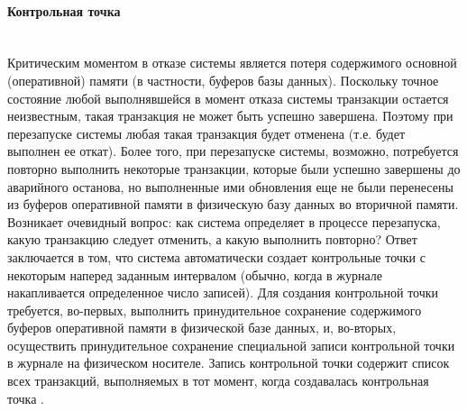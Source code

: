 \paragraph{Контрольная точка} ~\\
Критическим моментом в отказе системы является потеря содержимого основной
(оперативной) памяти (в частности, буферов базы данных). Поскольку точное состояние
любой выполнявшейся в момент отказа системы транзакции остается неизвестным, такая транзакция не может быть успешно завершена. Поэтому при перезапуске системы
любая такая транзакция будет отменена (т.е. будет выполнен ее откат).
Более того, при перезапуске системы, возможно, потребуется повторно выполнить некоторые транзакции, которые были успешно завершены
до аварийного останова, но выполненные ими обновления еще не были перенесены из
буферов оперативной памяти в физическую базу данных во вторичной памяти.
Возникает очевидный вопрос: как система определяет в процессе перезапуска, какую
транзакцию следует отменить, а какую выполнить повторно? Ответ заключается в том,
что система автоматически создает контрольные точки с некоторым наперед заданным
интервалом (обычно, когда в журнале накапливается определенное число записей). Для
создания контрольной точки требуется, во-первых, выполнить принудительное сохранение содержимого буферов оперативной памяти в физической базе данных, и, во-вторых,
осуществить принудительное сохранение специальной записи контрольной точки в журнале на физическом носителе. Запись контрольной точки содержит список всех транзакций, выполняемых в тот момент, когда создавалась контрольная точка \autocite{Date2005}.
 
